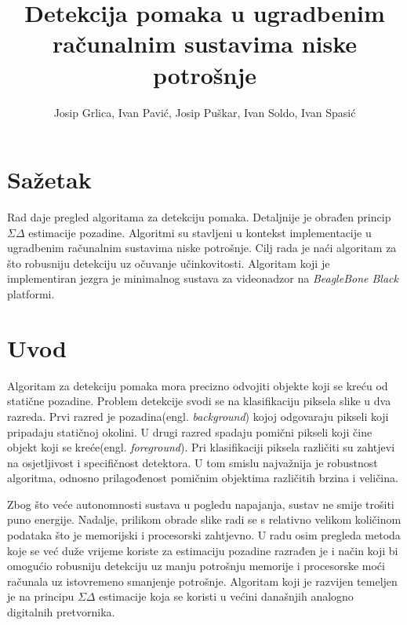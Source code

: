 \documentclass[a4paper,twocolumn]{article}
\begin{document}
\title{Detekcija pomaka u ugradbenim računalnim sustavima niske potrošnje}
\author{Josip Grlica, Ivan Pavić, Josip Puškar, Ivan Soldo, Ivan Spasić}
\maketitle


\section*{Sažetak}
Rad daje pregled algoritama za detekciju pomaka. Detaljnije je obrađen princip
\(\Sigma\Delta\) estimacije pozadine. Algoritmi su stavljeni u kontekst implementacije u
ugradbenim računalnim sustavima niske potrošnje. Cilj rada je naći algoritam
za što robusniju detekciju uz očuvanje učinkovitosti. Algoritam koji je
implementiran jezgra je minimalnog sustava za videonadzor na \textit{BeagleBone
Black} platformi.

\section{Uvod}
Algoritam za detekciju pomaka mora precizno odvojiti objekte koji se kreću od
statične pozadine. Problem detekcije svodi se na klasifikaciju piksela slike
u dva razreda. Prvi razred je pozadina(engl. \textit{background}) kojoj odgovaraju
pikseli koji pripadaju statičnoj okolini. U drugi razred spadaju pomični
pikseli koji čine objekt koji se kreće(engl. \textit{foreground}). Pri klasifikaciji
piksela različiti su zahtjevi na osjetljivost i specifičnost detektora.
U tom smislu najvažnija je robustnost algoritma, odnosno prilagođenost pomičnim
objektima različitih brzina i veličina.

Zbog što veće autonomnosti sustava u pogledu napajanja,
sustav ne smije trošiti puno energije. Nadalje, prilikom obrade slike radi se s
relativno velikom količinom podataka što je memorijski i procesorski zahtjevno.
U radu osim pregleda metoda koje se već duže vrijeme koriste za estimaciju
pozadine razrađen je i način koji bi omogućio robusniju detekciju uz manju
potrošnju memorije i procesorske moći računala uz istovremeno smanjenje
potrošnje. Algoritam koji je razvijen temeljen je na principu \(\Sigma\Delta\)
estimacije koja se koristi u većini današnjih analogno digitalnih pretvornika.
\end{document}

